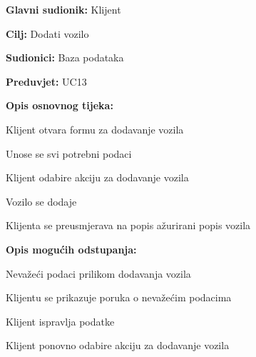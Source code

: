 \noindent {}
\begin{packed_item}

	\item \textbf{Glavni sudionik:} Klijent
	\item \textbf{Cilj:} Dodati vozilo
	\item \textbf{Sudionici:} Baza podataka
	\item \textbf{Preduvjet:} UC13
	\item \textbf{Opis osnovnog tijeka:}
	
	\item[] \begin{packed_enum}
		
		\item Klijent otvara formu za dodavanje vozila
		\item Unose se svi potrebni podaci
		\item Klijent odabire akciju za dodavanje vozila
		\item Vozilo se dodaje 
		\item Klijenta se preusmjerava na popis ažurirani popis vozila

	\end{packed_enum}
	
	\item  \textbf{Opis mogućih odstupanja:}
	
	\item[] \begin{packed_item}
		
		\item[2.a] Nevažeći podaci prilikom dodavanja vozila
		\item[] \begin{packed_enum}
			
			\item Klijentu se prikazuje poruka o nevažećim podacima
			\item Klijent ispravlja podatke
			\item Klijent ponovno odabire akciju za dodavanje vozila
			
		\end{packed_enum}
		
	\end{packed_item}
\end{packed_item}

\pagebreak

